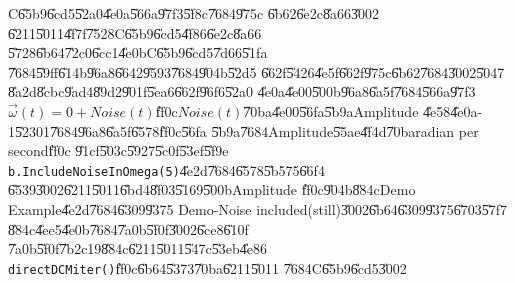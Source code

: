 \begin{case}
C\U{65b9}\U{6cd5}\U{52a0}\U{4e0a}\U{566a}\U{97f3}\U{5f8c}\U{7684}\U{975c}%
\U{6b62}\U{6e2c}\U{8a66}\U{3002}\newline
\U{6211}\U{5011}\U{4f7f}\U{7528}C\U{65b9}\U{6cd5}\U{4f86}\U{6e2c}\U{8a66}%
\U{5728}\U{6b64}\U{72c0}\U{6cc1}\U{4e0b}C\U{65b9}\U{6cd5}\U{7d66}\U{51fa}%
\U{7684}\U{59ff}\U{614b}\U{96a8}\U{6642}\U{9593}\U{7684}\U{904b}\U{52d5}%
\U{662f}\U{5426}\U{4e5f}\U{662f}\U{975c}\U{6b62}\U{7684}\U{3002}\U{5047}%
\U{8a2d}\U{8cbc}\U{9ad4}\U{89d2}\U{901f}\U{5ea6}\U{662f}\U{96f6}\U{52a0}%
\U{4e0a}\U{4e00}\U{500b}\U{96a8}\U{6a5f}\U{7684}\U{566a}\U{97f3}$\vec{\omega}%
(t)=0+Noise(t)$\U{ff0c}$Noise(t)$\U{70ba}\U{4e00}\U{56fa}\U{5b9a}Amplitude%
\U{4e58}\U{4e0a}-1\U{5230}1\U{7684}\U{96a8}\U{6a5f}\U{6578}\U{ff0c}\U{56fa}%
\U{5b9a}\U{7684}Amplitude\U{55ae}\U{4f4d}\U{70ba}radian per second\U{ff0c}%
\U{91cf}\U{503c}\U{5927}\U{5c0f}\U{53ef}\U{5f9e}\newline
\texttt{b.IncludeNoiseInOmega(5)}\U{4e2d}\U{7684}\U{6578}\U{5b57}5\U{66f4}%
\U{6539}\U{3002}\U{6211}\U{5011}\U{6bd4}\U{8f03}\U{5169}\U{500b}Amplitude%
\U{ff0c}\U{904b}\U{884c}Demo Example\U{4e2d}\U{7684}\U{6309}\U{9375}%
Demo-Noise included(still)\U{3002}\U{6b64}\U{6309}\U{9375}\U{6703}\U{57f7}%
\U{884c}\U{4ee5}\U{4e0b}\U{7684}\U{7a0b}\U{5f0f}\U{3002}\U{6ce8}\U{610f}%
\U{7a0b}\U{5f0f}\U{7b2c}19\U{884c}\U{6211}\U{5011}\U{547c}\U{53eb}\U{4e86}%
\texttt{directDCMiter()}\U{ff0c}\U{6b64}\U{5373}\U{70ba}\U{6211}\U{5011}%
\U{7684}C\U{65b9}\U{6cd5}\U{3002}
\end{case}

\bigskip

\begin{mdframed}[leftline=false, rightline=false,backgroundcolor=bg]
\inputminted[linenos,fontsize=\footnotesize]{python}{../../Scripts/cordtrans/Demo_Examples/Gyroscope-TeachDemo-5-NoiseIncludeInCMethod_still.py}
\end{mdframed}%

\bigskip

